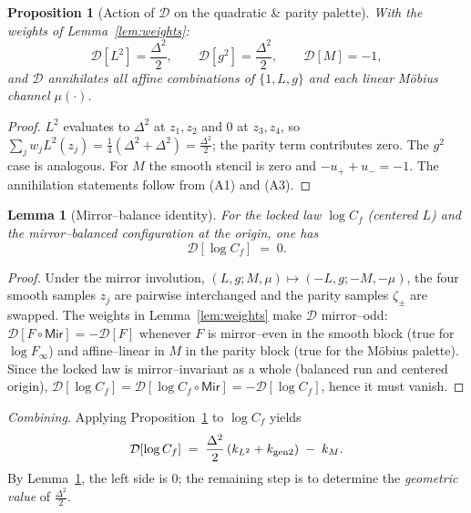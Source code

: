 \documentclass[12pt]{article}
\newtheorem{lemma}[theorem]{Lemma}
\newtheorem{proposition}[theorem]{Proposition}
\numberwithin{equation}{section}
\begin{document}
\begin{proposition}[Action of $\mathcal{D}$ on the quadratic \& parity palette]\label{prop:action}
With the weights of Lemma~\ref{lem:weights}:
\[
\mathcal{D}[L^2]=\frac{\Delta^2}{2},\qquad \mathcal{D}[g^2]=\frac{\Delta^2}{2},\qquad \mathcal{D}[M]=-1,
\]
and $\mathcal{D}$ annihilates all affine combinations of $\{1,L,g\}$ and each linear Möbius channel $\mu(\cdot)$.
\end{proposition}

\begin{proof}
$L^2$ evaluates to $\Delta^2$ at $z_1,z_2$ and $0$ at $z_3,z_4$, so $\sum_j w_j L^2(z_j)=\tfrac14(\Delta^2+\Delta^2)=\tfrac{\Delta^2}{2}$; the parity term contributes zero. The $g^2$ case is analogous. For $M$ the smooth stencil is zero and $-u_{+}+u_{-}=-1$. The annihilation statements follow from (A1) and (A3).
\end{proof}

\begin{lemma}[Mirror–balance identity]\label{lem:balance}
For the locked law $\log C_f$ (centered $L$) and the mirror–balanced configuration at the origin, one has
\[
\mathcal{D}[\log C_f]\;=\;0.
\]
\end{lemma}

\begin{proof}
Under the mirror involution, $(L,g;M,\mu)\mapsto(-L,g;-M,-\mu)$, the four smooth samples $z_j$ are pairwise interchanged and the parity samples $\zeta_{\pm}$ are swapped. The weights in Lemma~\ref{lem:weights} make $\mathcal{D}$ mirror–odd: $\mathcal{D}[F\circ \mathsf{Mir}]=-\mathcal{D}[F]$ whenever $F$ is mirror–even in the smooth block (true for $\log F_\infty$) and affine–linear in $M$ in the parity block (true for the Möbius palette). Since the locked law is mirror–invariant as a whole (balanced run and centered origin), $\mathcal{D}[\log C_f]=\mathcal{D}[\log C_f\circ \mathsf{Mir}]=-\mathcal{D}[\log C_f]$, hence it must vanish.
\end{proof}

\noindent
\textit{Combining.} Applying Proposition~\ref{prop:action} to $\log C_f$ yields
\begin{equation}\label{eq:DofCf}
\mathcal{D}[\log C_f]\;=\;\frac{\Delta^2}{2}\,(k_{L^2}+k_{\rm gen2})\;-\;k_M.
\end{equation}
By Lemma~\ref{lem:balance}, the left side is $0$; the remaining step is to determine the \emph{geometric value} of $\tfrac{\Delta^2}{2}$.

\bigskip
\end{document}
